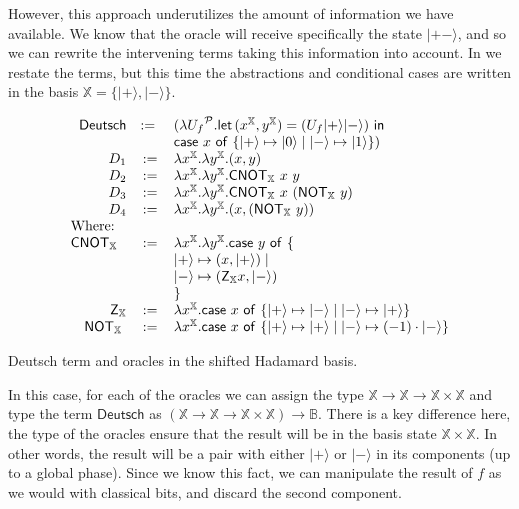 \documentclass[runningheads,orivec,envcountsame,envcountsect]{llncs}
\newcommand\ket[1]{\ensuremath{|#1\rangle}}
\newcommand\AbsBasis{\ensuremath{\mathcal{P}}}
\def\Pair#1#2{(#1,#2)} %
\def\Lam#1#2#3{\lambda#1^{#2}{.}#3} %
\def\letkeyword{\mathsf{let}}
\def\inkeyword{\mathsf{in}}
\def\LetP#1#2#3#4#5#6{\letkeyword\,\Pair{#1^{#2}}{#3^{#4}}=#5~\inkeyword~#6}
\def\case#1#2#3#4#5{\ensuremath{\mathsf{case}~#1~\mathsf{of}~\{#2\mapsto #4 \mid #3\mapsto #5\}}}
\newcommand\B{\mathbb B}
\newcommand\XB{\mathbb X}
\newcommand{\pauliZXB}{\mathsf{Z}_{\XB}}
\newcommand{\cnotXB}[2]{\mathsf{CNOT}_{\XB}\ #1\ #2}
\newcommand{\pauliXXB}[1]{\mathsf{NOT}_{\XB}\ #1}
\begin{document}
However, this approach underutilizes the amount of information we have available. We know that the oracle will receive specifically the state $\ket{+-}$, and so we can rewrite the intervening terms taking this information into account. In  we restate the terms, but this time the abstractions and conditional cases are written in the basis $\XB=\{\ket{+},\ket{-}\}$.

\begin{table}
    \footnotesize
    \[
    \begin{array}{r c l}
        \mathsf{Deutsch}&:=~&(\Lam{{U_f}}{\AbsBasis}{
                \LetP{x}{\XB}{y}{\XB}
                {(U_f \ket{+} \ket{-})}
                {\\ && \case{x}{\ket{+}}{\ket{-}}{\ket{0}}{\ket{1}}}})\\
        D_1 &:= &\Lam{x}{\XB}{\Lam{y}{\XB}{\Pair{x}{y}}}\\
        D_2 &:= &\Lam{x}{\XB}{\Lam{y}{\XB}{\cnotXB{x}{y}}}\\
        D_3 &:= &\Lam{x}{\XB}{\Lam{y}{\XB}{\cnotXB{x}{(\pauliXXB{y})}}}\\
        D_4 &:= &\Lam{x}{\XB}{\Lam{y}{\XB}{\Pair{x}{(\pauliXXB{y})}}}\\
        \multicolumn{3}{l}{\text{Where:}}\\
        \cnotXB{}{} &:=& \Lam{x}{\XB}{\Lam{y}{\XB}{
        \case{y}
        {\\ && \ket{+}}{\\ && \ket{-}}
        {\Pair{x}{\ket{+}}}{\Pair{\pauliZXB{x}}{\ket{-}} \\ &&}}}\\
        \pauliZXB{} &:=& \Lam{x}{\XB}{\case{x}{\ket{+}}{\ket{-}}{\ket{-}}{\ket{+}}}\\
        \pauliXXB{} &:=& \Lam{x}{\XB}{\case{x}{\ket{+}}{\ket{-}}{\ket{+}}{(-1)\cdot \ket{-}}}\\
    \end{array}
    \]
    \caption{Deutsch term and oracles in the shifted Hadamard basis.}
    \label{tab:DeutschShift}
\end{table}

In this case, for each of the oracles we can assign the type $\XB\to\XB\to\XB\times\XB$ and type the term $\mathsf{Deutsch}$ as $(\XB\to\XB\to\XB\times\XB)\to\B$. There is a key difference here, the type of the oracles ensure that the result will be in the basis state $\XB\times\XB$. In other words, the result will be a pair with either $\ket{+}$ or $\ket{-}$ in its components (up to a global phase). Since we know this fact, we can manipulate the result of $f$ as we would with classical bits, and discard the second component. 
\end{document}

